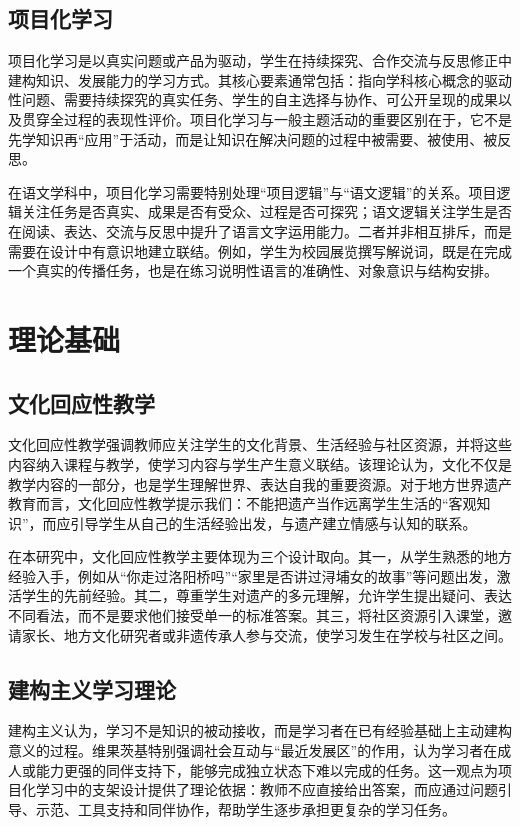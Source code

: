 \subsection{项目化学习}

项目化学习是以真实问题或产品为驱动，学生在持续探究、合作交流与反思修正中建构知识、发展能力的学习方式。其核心要素通常包括：指向学科核心概念的驱动性问题、需要持续探究的真实任务、学生的自主选择与协作、可公开呈现的成果以及贯穿全过程的表现性评价\cite{xiaxuemei2018}。项目化学习与一般主题活动的重要区别在于，它不是先学知识再“应用”于活动，而是让知识在解决问题的过程中被需要、被使用、被反思。

在语文学科中，项目化学习需要特别处理“项目逻辑”与“语文逻辑”的关系。项目逻辑关注任务是否真实、成果是否有受众、过程是否可探究；语文逻辑关注学生是否在阅读、表达、交流与反思中提升了语言文字运用能力。二者并非相互排斥，而是需要在设计中有意识地建立联结。例如，学生为校园展览撰写解说词，既是在完成一个真实的传播任务，也是在练习说明性语言的准确性、对象意识与结构安排。

\section{理论基础}

\subsection{文化回应性教学}

文化回应性教学强调教师应关注学生的文化背景、生活经验与社区资源，并将这些内容纳入课程与教学，使学习内容与学生产生意义联结\cite{gay2010}。该理论认为，文化不仅是教学内容的一部分，也是学生理解世界、表达自我的重要资源。对于地方世界遗产教育而言，文化回应性教学提示我们：不能把遗产当作远离学生生活的“客观知识”，而应引导学生从自己的生活经验出发，与遗产建立情感与认知的联系。

在本研究中，文化回应性教学主要体现为三个设计取向。其一，从学生熟悉的地方经验入手，例如从“你走过洛阳桥吗”“家里是否讲过浔埔女的故事”等问题出发，激活学生的先前经验。其二，尊重学生对遗产的多元理解，允许学生提出疑问、表达不同看法，而不是要求他们接受单一的标准答案。其三，将社区资源引入课堂，邀请家长、地方文化研究者或非遗传承人参与交流，使学习发生在学校与社区之间。

\subsection{建构主义学习理论}

建构主义认为，学习不是知识的被动接收，而是学习者在已有经验基础上主动建构意义的过程。维果茨基特别强调社会互动与“最近发展区”的作用，认为学习者在成人或能力更强的同伴支持下，能够完成独立状态下难以完成的任务\cite{vygotsky1978}。这一观点为项目化学习中的支架设计提供了理论依据：教师不应直接给出答案，而应通过问题引导、示范、工具支持和同伴协作，帮助学生逐步承担更复杂的学习任务。

